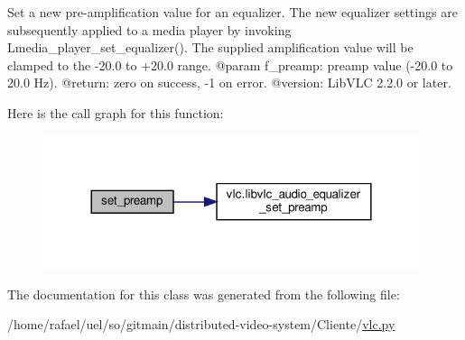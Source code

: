 \begin{DoxyVerb}Set a new pre-amplification value for an equalizer.
The new equalizer settings are subsequently applied to a media player by invoking
L{media_player_set_equalizer}().
The supplied amplification value will be clamped to the -20.0 to +20.0 range.
@param f_preamp: preamp value (-20.0 to 20.0 Hz).
@return: zero on success, -1 on error.
@version: LibVLC 2.2.0 or later.
\end{DoxyVerb}
 Here is the call graph for this function\+:
\nopagebreak
\begin{figure}[H]
\begin{center}
\leavevmode
\includegraphics[width=312pt]{classvlc_1_1_audio_equalizer_ab88c103714ca495bcaabdc3d8d6b0986_cgraph}
\end{center}
\end{figure}


The documentation for this class was generated from the following file\+:\begin{DoxyCompactItemize}
\item 
/home/rafael/uel/so/gitmain/distributed-\/video-\/system/\+Cliente/\hyperlink{vlc_8py}{vlc.\+py}\end{DoxyCompactItemize}
